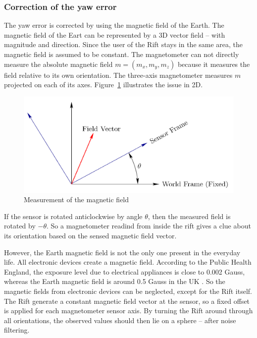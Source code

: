 \documentclass[12pt]{article}
\begin{document}
\subsubsection{Correction of the yaw error}
The yaw error is corrected by using the magnetic field of the Earth. The magnetic field of the Eart can be represented by a 3D vector field -- with magnitude and direction. Since the user of the Rift stays in the same area, the magnetic field is assumed to be constant. The magnetometer can not directly measure the absolute magnetic field $m = (m_x, m_y, m_z)$ because it measures the field relative to its own orientation. The three-axis magnetometer measures $m$ projected on each of its axes. Figure~\ref{field} illustrates the issue in 2D.

\begin{figure}[h]
  \centering
  \includegraphics[scale=0.2]{RotMag.png}
  \caption{\label{field} Measurement of the magnetic field}
\end{figure}

If the sensor is rotated anticlockwise by angle $\theta$, then the measured field is rotated by $-\theta$. So a magnetometer readind from inside the rift gives a clue about its orientation based on the sensed magnetic field vector.

However, the Earth magnetic field is not the only one present in the everyday life. All electronic devices create a magnetic field. According to the Public Health England, the exposure level due to electrical appliances is close to 0.002 Gauss, whereas the Earth magnetic field is around 0.5 Gauss in the UK \cite{HPA}. So the magnetic fields from electronic devices can be neglected, except for the Rift itself. The Rift generate a constant magnetic field vector at the sensor, so a fixed offset is applied for each magnetometer sensor axis. By turning the Rift around through all orientations, the observed values should then lie on a sphere -- after noise filtering.
\end{document}
